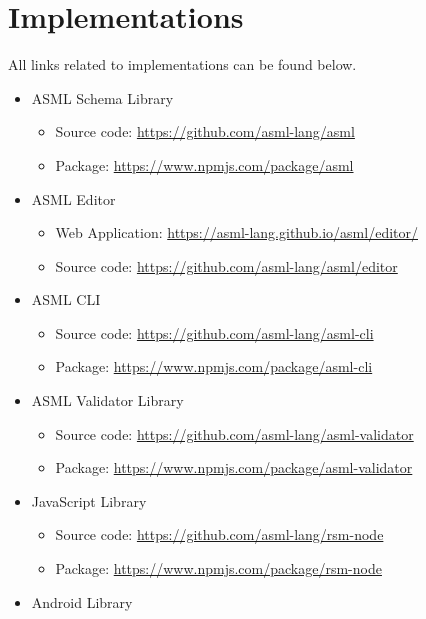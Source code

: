 \chapter*{Implementations} 

All links related to implementations can be found below.


\begin{itemize}
    \item ASML Schema Library
        \begin{itemize}
        \item Source code: \url{https://github.com/asml-lang/asml}
        \item Package: \url{https://www.npmjs.com/package/asml}
        \end{itemize}
    \item ASML Editor
        \begin{itemize}
        \item Web Application: \url{https://asml-lang.github.io/asml/editor/}
        \item Source code: \url{https://github.com/asml-lang/asml/editor}
        \end{itemize}
    \item ASML CLI
        \begin{itemize}
        \item Source code: \url{https://github.com/asml-lang/asml-cli}
        \item Package: \url{https://www.npmjs.com/package/asml-cli}
        \end{itemize}    
    \item ASML Validator Library
        \begin{itemize}
        \item Source code: \url{https://github.com/asml-lang/asml-validator}
        \item Package: \url{https://www.npmjs.com/package/asml-validator}
        \end{itemize}      
    \item JavaScript Library
        \begin{itemize}
        \item Source code: \url{https://github.com/asml-lang/rsm-node}
        \item Package: \url{https://www.npmjs.com/package/rsm-node}
        \end{itemize}   
    \item Android Library
        \begin{itemize}

\end{itemize}
\end{itemize}
